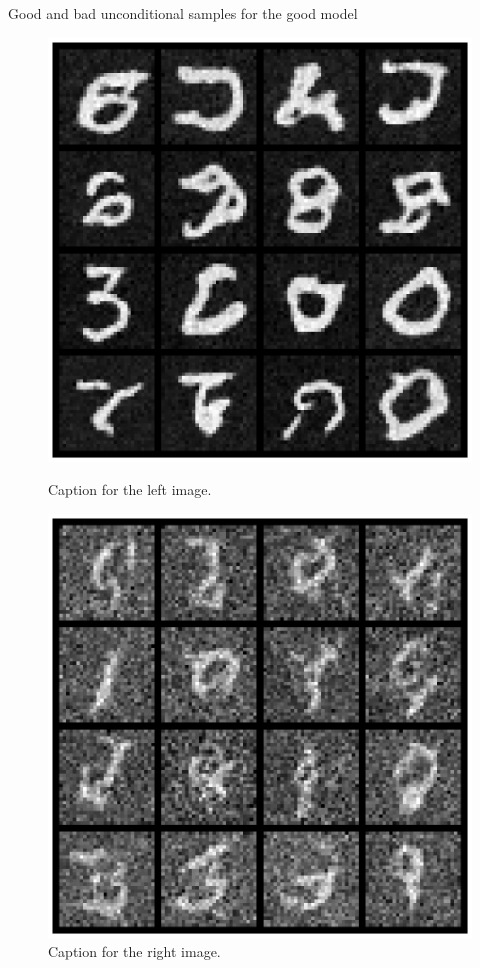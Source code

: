 \documentclass[11pt]{article}
\begin{document}
Good and bad unconditional samples for the good model
\begin{figure}[H]
    \centering
    \begin{minipage}{0.48\textwidth}
        \includegraphics[width=\linewidth]{figs/q1c_good_uncond_samples.png}
        \caption{Caption for the left image.}
        \label{fig:left_img_2}
    \end{minipage}\hfill
    \begin{minipage}{0.48\textwidth}
        \includegraphics[width=\linewidth]{figs/q1c_bad_uncond_samples.png}
        \caption{Caption for the right image.}
        \label{fig:right_img_2}
    \end{minipage}
\end{figure}
\end{document}
